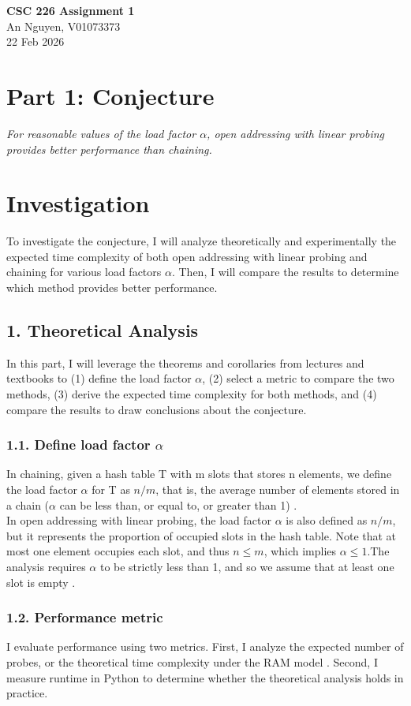 \documentclass[12pt, a4paper]{article}
\begin{document}
\begin{center}
{\bf CSC 226
Assignment 1}\\
An Nguyen, V01073373\\
22 Feb 2026
\end{center}
\section*{Part 1: Conjecture}   
\textit{For reasonable values of the load factor $\alpha$, open addressing with linear probing provides 
better performance than chaining.}
\section*{Investigation}
To investigate the conjecture, I will analyze theoretically and experimentally the expected time complexity of both open addressing 
with linear probing and chaining for various load factors $\alpha$. Then, I will compare the results to determine which 
method provides better performance. 
\subsection*{1. Theoretical Analysis}
In this part, I will leverage the theorems and corollaries from lectures and textbooks to (1) define the load factor $\alpha$, (2) select a
 metric to compare the two methods, (3) derive the expected time complexity for both methods, and (4) compare the results to draw conclusions about the 
conjecture.
\subsubsection*{1.1. Define load factor $\alpha$}
In chaining, given a hash table T with m slots that stores n elements, we define the load factor $\alpha$ for T as $n/m$, that is, 
the average number of elements stored in a chain ($\alpha$ can be less than, or equal to, or greater than 1) \cite{clrs}. \\
In open addressing with linear probing, the load factor $\alpha$ is also defined as $n/m$, but it represents the proportion of occupied slots 
in the hash table. 
Note that at most one element occupies each slot, and thus $n \leq m$, which implies $\alpha \leq 1$.The analysis requires $\alpha$ to be strictly 
less than 1, 
and so we assume that at least one slot is empty \cite{clrs}.
\subsubsection*{1.2. Performance metric}
I evaluate performance using two metrics. First, I analyze the expected number of probes, or the theoretical time complexity under 
the RAM model \cite{clrs}. Second, I measure runtime in Python to determine whether the theoretical analysis holds in practice.
\end{document}

